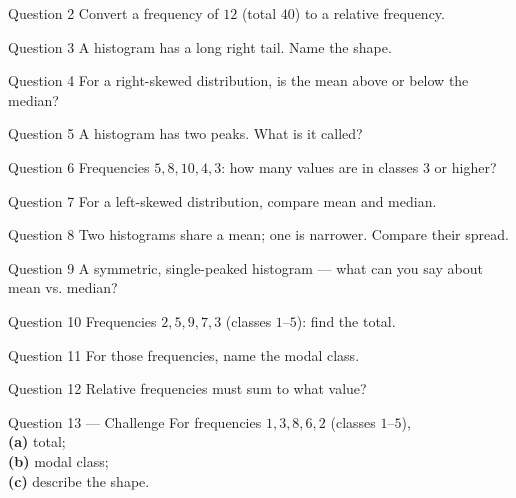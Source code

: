 \documentclass[11pt]{article}
\begin{document}
\begin{qbox}{Question 2}
Convert a frequency of $12$ (total $40$) to a relative frequency.\workspace{2.4cm}
\end{qbox}

\begin{qbox}{Question 3}
A histogram has a long right tail. Name the shape.\workspace{2.4cm}
\end{qbox}

\begin{qbox}{Question 4}
For a right-skewed distribution, is the mean above or below the median?\workspace{2.4cm}
\end{qbox}

\begin{qbox}{Question 5}
A histogram has two peaks. What is it called?\workspace{2.4cm}
\end{qbox}

\begin{qbox}{Question 6}
Frequencies $5,8,10,4,3$: how many values are in classes $3$ or higher?\workspace{2.4cm}
\end{qbox}

\begin{qbox}{Question 7}
For a left-skewed distribution, compare mean and median.\workspace{2.4cm}
\end{qbox}

\begin{qbox}{Question 8}
Two histograms share a mean; one is narrower. Compare their spread.\workspace{2.4cm}
\end{qbox}

\begin{qbox}{Question 9}
A symmetric, single-peaked histogram --- what can you say about mean vs. median?\workspace{2.4cm}
\end{qbox}

\begin{qbox}{Question 10}
Frequencies $2,5,9,7,3$ (classes $1$--$5$): find the total.\workspace{2.4cm}
\end{qbox}

\begin{qbox}{Question 11}
For those frequencies, name the modal class.\workspace{2.4cm}
\end{qbox}

\begin{qbox}{Question 12}
Relative frequencies must sum to what value?\workspace{2.4cm}
\end{qbox}

\begin{qbox}{Question 13 --- Challenge}
For frequencies $1,3,8,6,2$ (classes $1$--$5$), \\ \textbf{(a)} total; \\ \textbf{(b)} modal class; \\ \textbf{(c)} describe the shape.\workspace{3cm}
\end{qbox}
\end{document}
